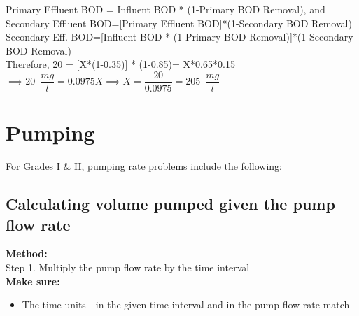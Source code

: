 \begin{enumerate}
Primary Effluent BOD = Influent BOD * (1-Primary BOD Removal), and\\
Secondary Effluent BOD=[Primary Effluent BOD]*(1-Secondary BOD Removal)\\
Secondary Eff. BOD=[Influent BOD * (1-Primary BOD Removal)]*(1-Secondary BOD Removal)\\

Therefore, 20 = [X*(1-0.35)] * (1-0.85)= X*0.65*0.15\\
$\implies 20 \enspace \dfrac{mg}{l}= 0.0975X \implies X=\dfrac{20}{0.0975}=\boxed{205 \enspace \dfrac{mg}{l}}$

\end{enumerate}
\section{Pumping}
For Grades I \& II, pumping rate problems include the following:
\subsection{Calculating volume pumped given the pump flow rate}

\textbf{Method:\\}
\hspace{1cm}Step 1. Multiply the pump flow rate by the time interval\\
\textbf{Make sure:}
\begin{itemize}
\item The time units - in the given time interval and in the pump flow rate match
\end{itemize}
